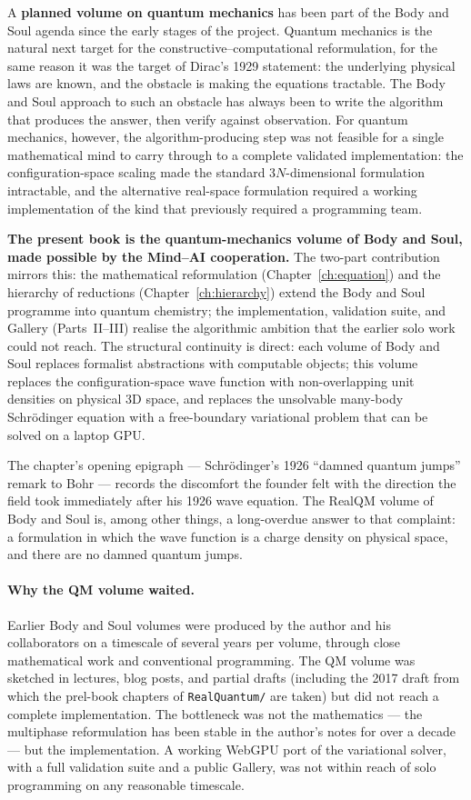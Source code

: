 A \textbf{planned volume on quantum mechanics} has been part of the Body and Soul agenda since the early stages of the project. Quantum mechanics is the natural next target for the constructive--computational reformulation, for the same reason it was the target of Dirac's 1929 statement: the underlying physical laws are known, and the obstacle is making the equations tractable. The Body and Soul approach to such an obstacle has always been to write the algorithm that produces the answer, then verify against observation. For quantum mechanics, however, the algorithm-producing step was not feasible for a single mathematical mind to carry through to a complete validated implementation: the configuration-space scaling made the standard $3N$-dimensional formulation intractable, and the alternative real-space formulation required a working implementation of the kind that previously required a programming team.

\textbf{The present book is the quantum-mechanics volume of Body and Soul, made possible by the Mind--AI cooperation.} The two-part contribution mirrors this: the mathematical reformulation (Chapter~\ref{ch:equation}) and the hierarchy of reductions (Chapter~\ref{ch:hierarchy}) extend the Body and Soul programme into quantum chemistry; the implementation, validation suite, and Gallery (Parts~II--III) realise the algorithmic ambition that the earlier solo work could not reach. The structural continuity is direct: each volume of Body and Soul replaces formalist abstractions with computable objects; this volume replaces the configuration-space wave function with non-overlapping unit densities on physical 3D space, and replaces the unsolvable many-body Schr\"odinger equation with a free-boundary variational problem that can be solved on a laptop GPU.

The chapter's opening epigraph --- Schr\"odinger's 1926 ``damned quantum jumps'' remark to Bohr --- records the discomfort the founder felt with the direction the field took immediately after his 1926 wave equation. The RealQM volume of Body and Soul is, among other things, a long-overdue answer to that complaint: a formulation in which the wave function is a charge density on physical space, and there are no damned quantum jumps.

\paragraph{Why the QM volume waited.}
Earlier Body and Soul volumes were produced by the author and his collaborators on a timescale of several years per volume, through close mathematical work and conventional programming. The QM volume was sketched in lectures, blog posts, and partial drafts (including the 2017 draft from which the prel-book chapters of \texttt{RealQuantum/} are taken) but did not reach a complete implementation. The bottleneck was not the mathematics --- the multiphase reformulation has been stable in the author's notes for over a decade --- but the implementation. A working WebGPU port of the variational solver, with a full validation suite and a public Gallery, was not within reach of solo programming on any reasonable timescale.

